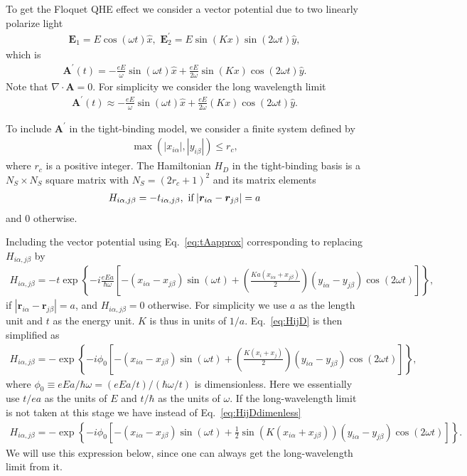 \documentclass[11pt,letterpaper]{article}
\begin{document}
To get the Floquet QHE effect we consider a vector potential due to two linearly polarize light
\begin{eqnarray}
	\bm E_1 = E \cos(\omega t) \hat{x},\,\, \bm E_{2}^{\prime} = E\sin(Kx) \sin(2\omega t) \hat{y},
\end{eqnarray}
which is 
\begin{eqnarray}
	\bm A^{\prime} (t) = -\frac{eE}{\omega} \sin(\omega t) \hat{x} + \frac{eE}{2\omega} \sin(Kx) \cos(2\omega t) \hat{y}.
\end{eqnarray}
Note that $\nabla \cdot \bm A = 0$. For simplicity we consider the long wavelength limit
\begin{eqnarray}
	\bm A^{\prime} (t) \approx -\frac{eE}{\omega} \sin(\omega t) \hat{x} + \frac{eE}{2\omega} \left(K x\right) \cos(2\omega t) \hat{y}.
\end{eqnarray}

To include $\bm A^{\prime}$ in the tight-binding model, we consider a finite system defined by 
\begin{eqnarray}
	\max(|x_{i\alpha}|,|y_{i\beta}|)\le r_c,
\end{eqnarray}
where $r_c$ is a positive integer. The Hamiltonian $H_D$ in the tight-binding basis is a $N_S \times N_S$ square matrix with $N_S = (2r_c+1)^2$ and its matrix elements
\begin{eqnarray}
	H_{i\alpha,j\beta} = -t_{i\alpha,j\beta}, \,\, {\rm if }\, |\bm r_{i\alpha} -\bm r_{j\beta}| = a
\end{eqnarray}
and $0$ otherwise. 

Including the vector potential using Eq.~\ref{eq:tAapprox} corresponding to replacing $H_{i\alpha,j\beta}$ by 
\begin{eqnarray}\label{eq:HijD}
	H_{i\alpha,j\beta} = - t \exp\left\{ -i\frac{eEa}{\hbar\omega}\left[-(x_{i\alpha} - x_{j\beta})\sin(\omega t) + \left(\frac{Ka(x_{i\alpha}+x_{j\beta})}{2}\right) (y_{i\alpha} - y_{j\beta}) \cos(2\omega t) \right] \right\},
\end{eqnarray}
if $|\bm r_{i\alpha} -\bm r_{j\beta}| = a$, and $H_{i\alpha,j\beta} = 0$ otherwise. For simplicity we use $a$ as the length unit and $t$ as the energy unit. $K$ is thus in units of $1/a$. Eq.~\ref{eq:HijD} is then simplified as 
\begin{eqnarray}\label{eq:HijDdimenless}
	H_{i\alpha,j\beta} = - \exp \left\{ -i \phi_0 \left[-(x_{i\alpha} - x_{j\beta})\sin(\omega t) + \left(\frac{K(x_i+x_j)}{2}\right ) (y_{i\alpha} - y_{j\beta}) \cos(2\omega t) \right] \right\},
\end{eqnarray}
where $\phi_0 \equiv eEa/\hbar \omega = (eEa/t)/(\hbar \omega/t)$ is dimensionless. Here we essentially use $t/ea$ as the units of $E$ and $t/\hbar$ as the units of $\omega$. If the long-wavelength limit is not taken at this stage we have instead of Eq.~\ref{eq:HijDdimenless}
\begin{eqnarray}
	H_{i\alpha,j\beta} = - \exp \left\{ -i \phi_0 \left[-(x_{i\alpha} - x_{j\beta})\sin(\omega t) + \frac{1}{2} \sin\left(K(x_{i\alpha}+x_{j\beta})\right ) (y_{i\alpha} - y_{j\beta}) \cos(2\omega t) \right] \right\}.
\end{eqnarray}
We will use this expression below, since one can always get the long-wavelength limit from it.
\end{document}
